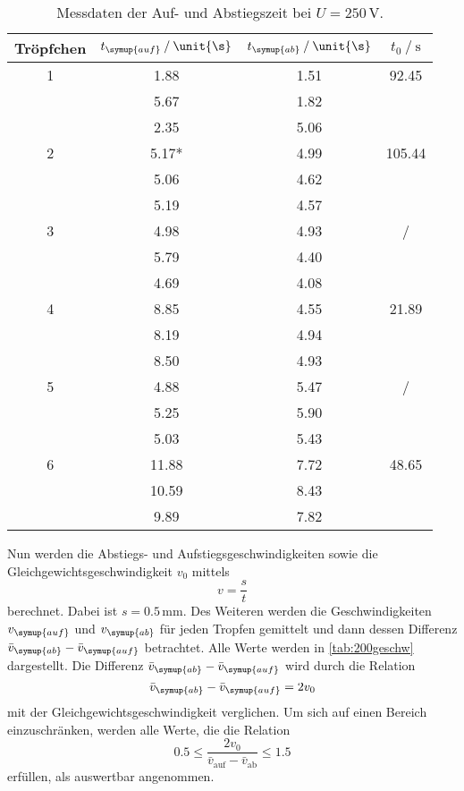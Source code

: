 \begin{table}
    \centering
    \caption{Messdaten der Auf- und Abstiegszeit bei $U=250\,\unit{\V}$.}
\begin{tabular}{c c c c}
    \toprule
        Tröpfchen &$t_{\symup{auf}} \mathbin{/} \unit{\s}$ & $t_{\symup{ab}}\mathbin{/} \unit{\s}$ & $t_0 \mathbin{/}\unit{\s}$ \\
    \midrule
    1&1.88&1.51&92.45 \\
    &5.67&1.82& \\
    &2.35&5.06& \\
2&5.17*&4.99&105.44 \\
    &5.06&4.62& \\
    &5.19&4.57& \\
  3&4.98&4.93&/ \\
     &5.79&4.40& \\
    &4.69&4.08& \\
4&8.85&4.55&21.89 \\
    &8.19&4.94& \\
     &8.50&4.93& \\
  5&4.88&5.47&/ \\
     &5.25&5.90& \\
    &5.03&5.43& \\
6&11.88&7.72&48.65 \\
   &10.59&8.43& \\
    &9.89&7.82& \\
    \bottomrule
    \end{tabular}
    \label{tab:250}
\end{table}

\newpage
Nun werden die Abstiegs- und Aufstiegsgeschwindigkeiten sowie die Gleichgewichtsgeschwindigkeit $v_0$ mittels
\begin{equation*}
    v=\frac{s}{t}
\end{equation*} 
berechnet. Dabei ist $s=0.5\,\unit{\milli\m}$. Des Weiteren werden die Geschwindigkeiten $v_{\symup{auf}}$ und $v_{\symup{ab}}$ für jeden Tropfen gemittelt und dann
dessen Differenz $\bar{v}_{\symup{ab}}-\bar{v}_{\symup{auf}}$ betrachtet. Alle Werte werden in \autoref{tab:200geschw} dargestellt. 
Die Differenz $\bar{v}_{\symup{ab}}-\bar{v}_{\symup{auf}}$ wird durch die Relation
\begin{equation}
    \bar{v}_{\symup{ab}}-\bar{v}_{\symup{auf}} = 2v_0
    \label{eqn:gültigkeit}
\end{equation}
mit der Gleichgewichtsgeschwindigkeit verglichen.
Um sich auf einen Bereich einzuschränken, werden alle Werte, die die Relation 
\begin{equation*}
    0.5\leq \frac{2v_0}{\bar{v}_{\text{auf}}-\bar{v}_{\text{ab}}}\leq 1.5
\end{equation*}
erfüllen, als auswertbar angenommen.

